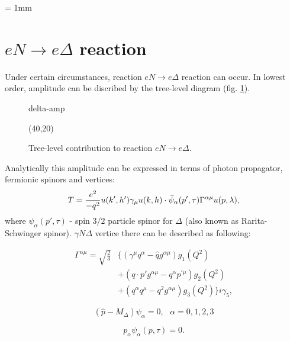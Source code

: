 \documentclass{article}
\begin{document}
	\unitlength = 1mm
\section{ $eN \to e\Delta$ reaction}
	Under certain circumstances, reaction $eN \to e\Delta$ reaction
	can occur. In lowest order, amplitude can be discribed by the
	tree-level diagram (fig. \ref{fig:delta-amp}).
	\begin{figure} \centering \label{fig:delta-amp}
	\begin{fmffile}{delta-amp}
		\begin{fmfgraph*}(40,20)
		\end{fmfgraph*}
	\end{fmffile}
	\caption{Tree-level contribution to reaction $eN \to e\Delta$.}
	\end{figure}
	
	Analytically this amplitude can be expressed in terms of photon propagator,
	fermionic spinors and vertices:
	\begin{equation}
		T = \frac{e^2}{-q^2} \-{u}(k', h') \gamma_\mu u(k, h) \cdot
		\bar{\psi}_\alpha (p', \tau) \Gamma^{\alpha \mu} u(p, \lambda),
	\end{equation}
	where $\psi_\alpha (p', \tau)$ - spin $3/2$ particle spinor for $\Delta$
	(also known as Rarita-Schwinger spinor). $\gamma N \Delta$ vertice there
	can be described as following:
	
	\begin{align} \label{eqn:polarization-3-vectors}
	\Gamma^{\alpha \mu} = \sqrt{\frac{2}{3}}& \{ (\gamma^\mu 
	q^\alpha - \hat{q} g^{\alpha \mu})g_1(Q^2) 
	\\
	& + (q \cdot p' g^{\alpha \mu} - q^\alpha p^{\prime \mu}) g_2(Q^2)
	\\
	& + (q^\alpha q^\mu - q^2 g^{\alpha \mu}) g_3(Q^2)\} i \gamma_5,
	\end{align}

	\begin{equation}
		(\hat{p} - M_\Delta) \psi_\alpha = 0, \,\,\,\, \alpha = 0,1,2,3
	\end{equation}
	
	\begin{equation}
		p_\alpha \psi_\alpha(p, \tau) = 0.
	\end{equation}
\end{document}

